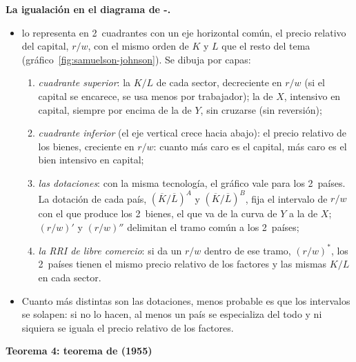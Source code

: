 \documentclass[11pt]{article}
\begin{document}
\begin{anotaciones}
\textbf{La igualación en el diagrama de -.}
\begin{itemize}
\item \textcite{Johnson1957Factor} lo representa en 2~cuadrantes con un eje horizontal común, el precio relativo del capital, $r/w$, con el mismo orden de $K$ y $L$ que el resto del tema (gráfico~\ref{fig:samuelson-johnson}). Se dibuja por capas:
  \begin{enumerate}
  \item \emph{cuadrante superior}: la $K/L$ de cada sector, decreciente en $r/w$ (si el capital se encarece, se usa menos por trabajador); la de $X$, intensivo en capital, siempre por encima de la de $Y$, sin cruzarse (sin reversión);
  \item \emph{cuadrante inferior} (el eje vertical crece hacia abajo): el precio relativo de los bienes, creciente en $r/w$: cuanto más caro es el capital, más caro es el bien intensivo en capital;
  \item \emph{las dotaciones}: con la misma tecnología, el gráfico vale para los 2~países. La dotación de cada país, $(\overline K/\overline L)^A$ y $(\overline K/\overline L)^B$, fija el intervalo de $r/w$ con el que produce los 2~bienes, el que va de la curva de $Y$ a la de $X$; $(r/w)'$ y $(r/w)''$ delimitan el tramo común a los 2~países;
  \item \emph{la RRI de libre comercio}: si da un $r/w$ dentro de ese tramo, $(r/w)^*$, los 2~países tienen el mismo precio relativo de los factores y las mismas $K/L$ en cada sector.
  \end{enumerate}
\item Cuanto más distintas son las dotaciones, menos probable es que los intervalos se solapen: si no lo hacen, al menos un país se especializa del todo y ni siquiera se iguala el precio relativo de los factores.
\end{itemize}
\begin{figuracaja}
\caption{Igualación del precio de los factores: el diagrama de -}\label{fig:samuelson-johnson}
\end{figuracaja}
\end{anotaciones}

\textbf{Teorema 4: teorema de  (1955)}
\end{document}

